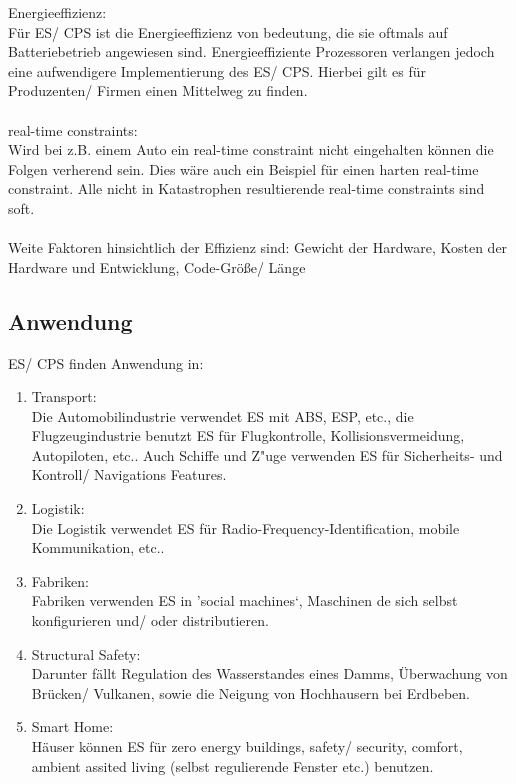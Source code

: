 Energieeffizienz:\\
Für ES/ CPS ist die Energieeffizienz von bedeutung, die sie oftmals auf Batteriebetrieb angewiesen sind.
Energieeffiziente Prozessoren verlangen jedoch eine aufwendigere Implementierung des ES/ CPS.
Hierbei gilt es für Produzenten/ Firmen einen Mittelweg zu finden.
\\ \\
real-time constraints:\\
Wird bei z.B. einem Auto ein real-time constraint nicht eingehalten können die Folgen verherend sein.
Dies wäre auch ein Beispiel für einen harten real-time constraint.
Alle nicht in Katastrophen resultierende real-time constraints sind soft.
\\ \\
Weite Faktoren hinsichtlich der Effizienz sind: Gewicht der Hardware, Kosten der Hardware und Entwicklung, Code-Größe/ Länge

\subsection{Anwendung}

ES/ CPS finden Anwendung in:\\
\begin{enumerate}
    \item Transport:\\
          Die Automobilindustrie verwendet ES mit ABS, ESP, etc., die 
          Flugzeugindustrie benutzt ES für Flugkontrolle, Kollisionsvermeidung,
          Autopiloten, etc.. Auch Schiffe und Z"uge verwenden ES für 
          Sicherheits- und Kontroll/ Navigations Features.\\
    \item Logistik:\\
          Die Logistik verwendet ES für Radio-Frequency-Identification,
          mobile Kommunikation, etc..\\
    \item Fabriken:\\
          Fabriken verwenden ES in 'social machines`, Maschinen de sich selbst 
          konfigurieren und/ oder distributieren.\\
    \item Structural Safety:\\
          Darunter fällt Regulation des Wasserstandes eines Damms,
          Überwachung von Brücken/ Vulkanen, sowie die
          Neigung von Hochhausern bei Erdbeben.\\
    \item Smart Home:\\
          Häuser können ES für zero energy buildings, safety/ security, 
          comfort, ambient assited living (selbst regulierende Fenster etc.)
          benutzen.\\
\end{enumerate}
